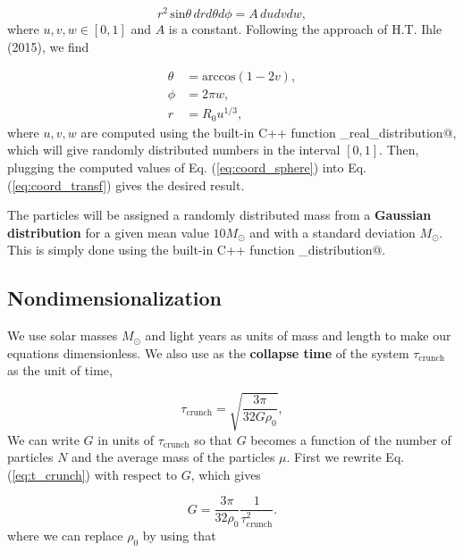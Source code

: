\documentclass{article}
\begin{document}
\begin{multicols}{2}
\begin{equation*}
	r^2 \, \mathrm{sin} \theta \, dr d\theta d\phi = A \, du dv dw,
\end{equation*}
where $u,v,w \in [0,1]$ and $A$ is a constant. Following the approach of H.T. Ihle (2015), we find 

\begin{equation}\label{eq:coord_sphere}
\begin{aligned}
	\theta &= \mathrm{arccos}(1 - 2v), \\
	\phi &= 2\pi w, \\
	r &= R_0 u^{1/3},
\end{aligned}
\end{equation}
where $u,v,w$ are computed using the built-in C++ function \verb@uniform_real_distribution@, which will give randomly distributed numbers in the interval $[0,1]$. Then, plugging the computed values of Eq. (\ref{eq:coord_sphere}) into Eq. (\ref{eq:coord_transf}) gives the desired result. 

The particles will be assigned a randomly distributed mass from a \textbf{Gaussian distribution} for a given mean value $10 M_{\odot}$ and with a standard deviation $M_{\odot}$. This is simply done using the built-in C++ function \verb@normal_distribution@.  



\subsection{Nondimensionalization}\label{sec:nondim}
We use solar masses $M_{\odot}$ and light years as units of mass and length to make our equations dimensionless. We also use as the \textbf{collapse time} of the system $\tau_{\mathrm{crunch}}$ as the unit of time,  %

\begin{equation}\label{eq:t_crunch}
\tau_{\mathrm{crunch}} = \sqrt{\frac{3 \pi}{32G\rho_0}},
\end{equation} 
We can write $G$ in units of $\tau_{\mathrm{crunch}}$ so that $G$ becomes a function of the number of particles $N$ and the average mass of the particles $\mu$. First we rewrite Eq. (\ref{eq:t_crunch}) with respect to $G$, which gives

\begin{equation}\label{eq:G}
	G = \frac{3\pi}{32 \rho_0} \frac{1}{\tau_{\mathrm{crunch}}^2}.
\end{equation}
where we can replace $\rho_0$ by using that


\end{multicols}
\end{document}
